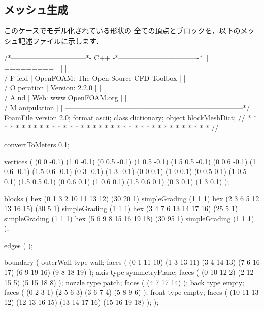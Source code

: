 \subsection{メッシュ生成}
\label{ssec:3.4.2}
このケースでモデル化されている形状の
全ての頂点とブロックを，以下のメッシュ記述ファイルに示します．
\begin{OFverbatim}
/*--------------------------------*- C++ -*----------------------------------*\
| =========                 |                                                 |
| \\      /  F ield         | OpenFOAM: The Open Source CFD Toolbox           |
|  \\    /   O peration     | Version:  2.2.0                                 |
|   \\  /    A nd           | Web:      www.OpenFOAM.org                      |
|    \\/     M anipulation  |                                                 |
\*---------------------------------------------------------------------------*/
FoamFile
{
    version     2.0;
    format      ascii;
    class       dictionary;
    object      blockMeshDict;
}
// * * * * * * * * * * * * * * * * * * * * * * * * * * * * * * * * * * * * * //

convertToMeters 0.1;

vertices        
(
    (0 0 -0.1)
    (1 0 -0.1)
    (0 0.5 -0.1)
    (1 0.5 -0.1)
    (1.5 0.5 -0.1)
    (0 0.6 -0.1)
    (1 0.6 -0.1)
    (1.5 0.6 -0.1)
    (0 3 -0.1)
    (1 3 -0.1)
    (0 0 0.1)
    (1 0 0.1)
    (0 0.5 0.1)
    (1 0.5 0.1)
    (1.5 0.5 0.1)
    (0 0.6 0.1)
    (1 0.6 0.1)
    (1.5 0.6 0.1)
    (0 3 0.1)
    (1 3 0.1)
);

blocks          
(
    hex (0 1 3 2 10 11 13 12) (30 20 1) simpleGrading (1 1 1)
    hex (2 3 6 5 12 13 16 15) (30 5 1) simpleGrading (1 1 1)
    hex (3 4 7 6 13 14 17 16) (25 5 1) simpleGrading (1 1 1)
    hex (5 6 9 8 15 16 19 18) (30 95 1) simpleGrading (1 1 1)
);

edges           
(
);

boundary
(
    outerWall
    {
        type wall;
        faces
        (
            (0 1 11 10)
            (1 3 13 11)
            (3 4 14 13)
            (7 6 16 17)
            (6 9 19 16)
            (9 8 18 19)
        );
    }
    axis
    {
        type symmetryPlane;
        faces
        (
            (0 10 12 2)
            (2 12 15 5)
            (5 15 18 8)
        );
    }
    nozzle
    {
        type patch;
        faces
        (
            (4 7 17 14)
        );
    }
    back
    {
        type empty;
        faces
        (
            (0 2 3 1)
            (2 5 6 3)
            (3 6 7 4)
            (5 8 9 6)
        );
    }
    front
    {
        type empty;
        faces
        (
            (10 11 13 12)
            (12 13 16 15)
            (13 14 17 16)
            (15 16 19 18)
        );
    }
);


\end{OFverbatim}
